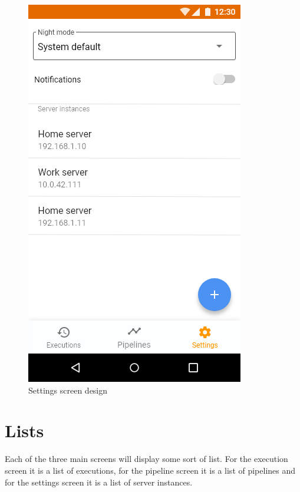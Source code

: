 \begin{figure}
\begin{minipage}[b]{0.32\textwidth}
    	\includegraphics[width=\textwidth]{pics/xd/Bottom Navigation - settings.png}
    	\caption[Settings]{Settings screen design}\label{fig:xdSettings}
    \end{minipage}
\end{figure}

\section{Lists}
Each of the three main screens will display some sort of list.
For the execution screen it is a list of executions, for the pipeline screen it is a list of pipelines and for the settings screen it is a list of server instances.

